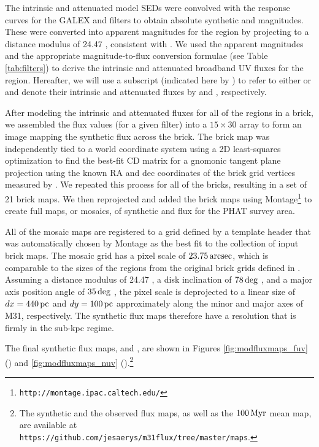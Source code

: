\documentclass[iop, tighten]{emulateapj}
\begin{document}
The intrinsic and attenuated model SEDs were convolved with the response curves
for the GALEX \fuv{} and \nuv{} filters to obtain absolute synthetic \fuv{} and
\nuv{} magnitudes. These were converted into apparent magnitudes for the region
by projecting to a distance modulus of 24.47 \citep{McConnachie:2005},
consistent with \citet{Lewis:2014}. We used the apparent magnitudes and the
appropriate magnitude-to-flux conversion formulae (see Table \ref{tab:filters})
to derive the intrinsic and attenuated broadband UV fluxes for the region.
Hereafter, we will use a subscript (indicated here by \filter{}) to refer to
either \fuv{} or \nuv{} and denote their intrinsic and attenuated fluxes by
\fxsfhz{} and \fxsfh{}, respectively.

After modeling the intrinsic and attenuated fluxes for all of the regions in a
brick, we assembled the flux values (for a given filter) into a $15 \times 30$
array to form an image mapping the synthetic flux across the brick. The brick
map was independently tied to a world coordinate system using a 2D
least-squares optimization to find the best-fit CD matrix
\citep{Calabretta:2002} for a gnomonic tangent plane projection using the known
RA and dec coordinates of the brick grid vertices measured by
\citet{Lewis:2014}. We repeated this process for all of the \citet{Lewis:2014}
bricks, resulting in a set of 21 brick maps. We then reprojected and added the
brick maps using Montage\footnote{\texttt{http://montage.ipac.caltech.edu/}} to
create full maps, or mosaics, of synthetic \fuv{} and \nuv{} flux for the PHAT
survey area.

All of the mosaic maps are registered to a grid defined by a template header
that was automatically chosen by Montage as the best fit to the collection of
input brick maps. The mosaic grid has a pixel scale of $23.75\,\mathrm{arcsec}$, which
is comparable to the sizes of the regions from the original brick grids defined
in \citet{Lewis:2014}. Assuming a distance modulus of 24.47
\citep{McConnachie:2005}, a disk inclination of $78\,\mathrm{deg}$ \citep{Tully:1994},
and a major axis position angle of $35\,\mathrm{deg}$ \citep{deVaucouleurs:1995}, the
pixel scale is deprojected to a linear size of $dx = 440\,\mathrm{pc}$ and $dy = 100\,\mathrm{pc}$
approximately along the minor and major axes of M31, respectively. The
synthetic flux maps therefore have a resolution that is firmly in the sub-kpc
regime.

The final synthetic flux maps, \fxsfhz{} and \fxsfh{}, are shown in Figures
\ref{fig:modfluxmaps_fuv} (\fuv{}) and \ref{fig:modfluxmaps_nuv}
(\nuv{}).\footnote{\label{github}The synthetic and the observed flux maps, as
well as the $100\,\mathrm{Myr}$ mean \sfr{} map, are available at
\texttt{https://github.com/jesaerys/m31flux/tree/master/maps}.}
\end{document}
